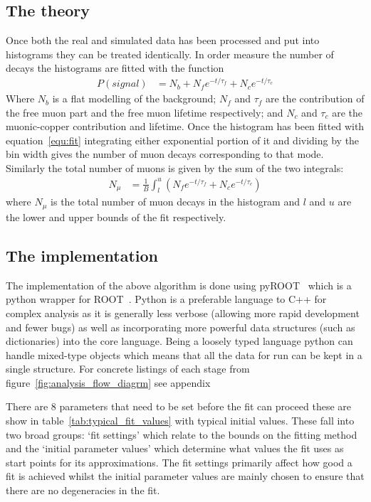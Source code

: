 \documentclass[]{article}
\begin{document}
\subsection{The theory} %
\label{sub:the_theory}
Once both the real and simulated data has been processed and put into histograms they can be treated identically. In order measure the number of decays the histograms are fitted with the function 
\begin{align}
    P(signal) &= N_{b} + N_{f}e^{-t / \tau_{f}} + N_{c} e^{-t / \tau_{c}} \label{equ:fit}
\end{align}
Where $N_{b}$ is a flat modelling of the background; $N_{f}$ and $\tau_{f}$ are the contribution of the free muon part and the free muon lifetime respectively; and $N_{c}$ and $\tau_{c}$ are the muonic-copper contribution and lifetime. Once the histogram has been fitted with equation~\ref{equ:fit} integrating either exponential portion of it and dividing by the bin width gives the number of muon decays corresponding to that mode. Similarly the total number of muons is given by the sum of the two integrals:
\begin{align}
    N_{\mu} &= \frac{1}{B} \int_{l}^{u}\left(N_{f}e^{-t / \tau_{f}} + N_{c} e^{-t / \tau_{c}} \right) \label{equ:sum_exp_parts}
\end{align}
where $N_{\mu}$ is the total number of muon decays in the histogram and $l$ and $u$ are the lower and upper bounds of the fit respectively. 

\subsection{The implementation} %
\label{sub:the_implementation}
The implementation of the above algorithm is done using pyROOT~\cite{lavrijsenpyroot} which is a python wrapper for ROOT~\cite{Brun199781}. Python is a preferable language to C++ for complex analysis as it is generally less verbose (allowing more rapid development and fewer bugs) as well as incorporating more powerful data structures (such as dictionaries) into the core language. Being a loosely typed language python can handle mixed-type objects which means that all the data for run can be kept in a single structure. For concrete listings of each stage from figure~\ref{fig:analysis_flow_diagrm} see appendix

There are 8 parameters that need to be set before the fit can proceed these are show in table~\ref{tab:typical_fit_values} with typical initial values. These fall into two broad groups: `fit settings' which relate to the bounds on the fitting method and the `initial parameter values' which determine what values the fit uses as start points for its approximations. The fit settings primarily affect how good a fit is achieved whilst the initial parameter values are mainly chosen to ensure that there are no degeneracies in the fit. 
\end{document}
